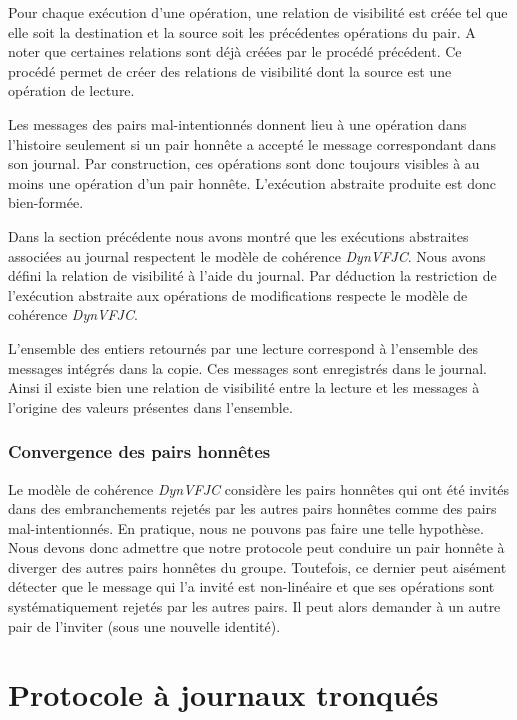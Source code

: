 Pour chaque exécution d'une opération, une relation de visibilité est créée tel que elle soit la destination et la source soit les précédentes opérations du pair.
A noter que certaines relations sont déjà créées par le procédé précédent.
Ce procédé permet de créer des relations de visibilité dont la source est une opération de lecture. 

Les messages des pairs mal-intentionnés donnent lieu à une opération dans l'histoire seulement si un pair honnête a accepté le message correspondant dans son journal.
Par construction, ces opérations sont donc toujours visibles à au moins une opération d'un pair honnête.
L'exécution abstraite produite est donc bien-formée.

Dans la section précédente nous avons montré que les exécutions abstraites associées au journal respectent le modèle de cohérence \emph{DynVFJC}.
Nous avons défini la relation de visibilité à l'aide du journal.
Par déduction la restriction de l'exécution abstraite aux opérations de modifications respecte le modèle de cohérence \emph{DynVFJC}.

L'ensemble des entiers retournés par une lecture correspond à l'ensemble des messages intégrés dans la copie. Ces messages sont enregistrés dans le journal.
Ainsi il existe bien une relation de visibilité entre la lecture et les messages à l'origine des valeurs présentes dans l'ensemble.

\subsubsection{Convergence des pairs honnêtes}

Le modèle de cohérence \emph{DynVFJC} considère les pairs honnêtes qui ont été invités dans des embranchements rejetés par les autres pairs honnêtes comme des pairs mal-intentionnés.
En pratique, nous ne pouvons pas faire une telle hypothèse.
Nous devons donc admettre que notre protocole peut conduire un pair honnête à diverger des autres pairs honnêtes du groupe.
Toutefois, ce dernier peut aisément détecter que le message qui l'a invité est non-linéaire et que ses opérations sont systématiquement rejetés par les autres pairs.
Il peut alors demander à un autre pair de l'inviter (sous une nouvelle identité).


\section{Protocole à journaux tronqués}\label{sec:pruned-log-protocol}

